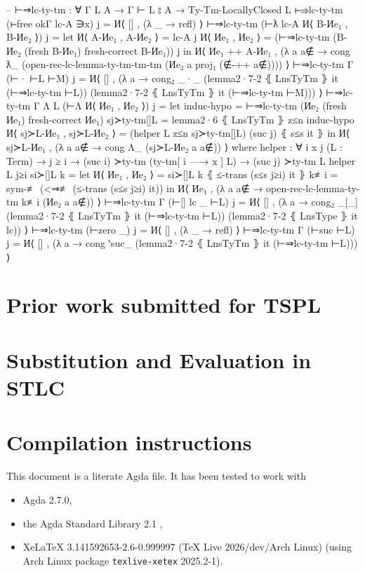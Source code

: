 \documentclass[logo,bsc,singlespacing,parskip,online]{infthesis}
\begin{document}
\begin{code}
  -- ⊢⇒lc-ty-tm : ∀ {Γ L A} → Γ ⊢ L ⦂ A → Ty-Tm-LocallyClosed L
  ⊢⇒lc-ty-tm (⊢free okΓ lc-A ∋x) j = И⟨ [] , (λ _ → refl) ⟩
  ⊢⇒lc-ty-tm (⊢ƛ lc-A И⟨ B-Иe₁ , B-Иe₂ ⟩) j =
    let И⟨ A-Иe₁ , A-Иe₂ ⟩ = lc-A j
        И⟨ Иe₁ , Иe₂ ⟩ = (⊢⇒lc-ty-tm (B-Иe₂ (fresh B-Иe₁) {fresh-correct B-Иe₁})) j
    in И⟨ Иe₁ ++ A-Иe₁ , (λ a {a∉} → cong ƛ_
      (open-rec-lc-lemma-ty-tm-tm-tm (Иe₂ a {proj₁ (∉-++ a∉)}))) ⟩
  ⊢⇒lc-ty-tm {Γ} (⊢· ⊢L ⊢M) j = И⟨ [] , (λ a → cong₂ _·_
    (lemma2·7-2 ⦃ LnsTyTm ⦄ it (⊢⇒lc-ty-tm ⊢L))
    (lemma2·7-2 ⦃ LnsTyTm ⦄ it (⊢⇒lc-ty-tm ⊢M))) ⟩
  ⊢⇒lc-ty-tm {Γ} {Λ L} (⊢Λ И⟨ Иe₁ , Иe₂ ⟩) j =
      let induc-hypo = ⊢⇒lc-ty-tm (Иe₂ (fresh Иe₁) {fresh-correct Иe₁})
          sj≻ty-tm[]L = lemma2·6 ⦃ LnsTyTm ⦄ z≤n induc-hypo
          И⟨ sj≻L-Иe₁ , sj≻L-Иe₂ ⟩ = (helper L z≤n sj≻ty-tm[]L) (suc j) ⦃ s≤s it ⦄
      in И⟨ sj≻L-Иe₁ , (λ a {a∉} → cong Λ_ (sj≻L-Иe₂ a {a∉})) ⟩
    where
      helper : ∀ {i x j} (L : Term) → j ≥ i → (suc i) ≻ty-tm (ty-tm[ i —→ x ] L) → (suc j) ≻ty-tm L
      helper L j≥i si≻[]L k =
        let И⟨ Иe₁ , Иe₂ ⟩ = si≻[]L k ⦃ ≤-trans (s≤s j≥i) it ⦄
            k≢i = sym-≢ (<⇒≢ (≤-trans (s≤s j≥i) it))
        in И⟨ Иe₁ , (λ a {a∉} → open-rec-lc-lemma-ty-tm k≢i (Иe₂ a {a∉})) ⟩
  ⊢⇒lc-ty-tm {Γ} (⊢[] lc _ ⊢L) j = И⟨ [] , (λ a → cong₂ _[_]
    (lemma2·7-2 ⦃ LnsTyTm ⦄ it (⊢⇒lc-ty-tm ⊢L))
    (lemma2·7-2 ⦃ LnsType ⦄ it lc)) ⟩
  ⊢⇒lc-ty-tm (⊢zero _) j = И⟨ [] , (λ _ → refl) ⟩
  ⊢⇒lc-ty-tm {Γ} (⊢suc ⊢L) j = И⟨ [] , (λ a →
    cong ‵suc_ (lemma2·7-2 ⦃ LnsTyTm ⦄ it (⊢⇒lc-ty-tm ⊢L))) ⟩
\end{code}

\chapter{Prior work submitted for TSPL}
\label{appendix:tspl}


\chapter{Substitution and Evaluation in STLC}
\label{appendix:stlc_sub_and_eval}


\chapter{Compilation instructions}
\label{appendix:compilation_instructions}

This document is a literate Agda file. It has been tested to work with
\begin{itemize}
  \item Agda 2.7.0,

  \item the Agda Standard Library 2.1 \citep{the_agda_community_agda_2024},

  \item XeLaTeX 3.141592653-2.6-0.999997 (TeX Live 2026/dev/Arch Linux) (using Arch Linux package
  \texttt{texlive-xetex} 2025.2-1).
\end{itemize}
\end{document}
